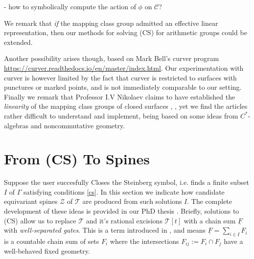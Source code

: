 \documentclass[12pt]{amsart}
\theoremstyle{definition}
\theoremstyle{remark}
\newcommand{\bZ}{\mathbb{Z}}
\newcommand{\uF}{\underline{F}}
\newcommand{\sC}{\mathscr{C}}
\newcommand{\sT}{\mathscr{T}}
\newcommand{\sZ}{\mathscr{Z}}
\begin{document}
- how to symbolically compute the action of $\phi$ on $\sC$? 

We remark that \emph{if} the mapping class group admitted an effective linear representation, then our methods for solving (CS) for arithmetic groups could be extended.

Another possibility arises though, based on Mark Bell's curver program \url{https://curver.readthedocs.io/en/master/index.html}. Our experimentation with curver is however limited by the fact that curver is restricted to surfaces with punctures or marked points, and is not immediately comparable to our setting. Finally we remark that Professor I.V Nikolaev claims to have established the \emph{linearity} of the mapping class groups of closed surfaces \cite{nikolaev2018mapping}, \cite{nikolaev2001toric}, yet we find the articles rather difficult to understand and implement, being based on some ideas from $C^*$-algebras and noncommutative geometry.

















\section{From (CS) To Spines}
Suppose the user succesfully Closes the Steinberg symbol, i.e. finds a finite subset $I$ of $\Gamma$ satisfying conditions \ref{cs}. In this section we indicate how candidate equivariant spines $\sZ$ of $\sT$ are produced from such solutions $I$. The complete development of these ideas is provided in our PhD thesis \cite{martel}. Briefly, solutions to (CS) allow us to replace $\sT$ and it's rational excisions $\sT[t]$ with a chain sum $\uF$ with \textit{well-separated gates}. This is a term introduced in \cite{martel}, and means $\uF=\sum_{i\in I} F_i$ is a countable chain sum of sets $F_i$ where the intersections $F_{ij}:=F_i\cap F_j$ have a well-behaved fixed geometry.
\end{document}
